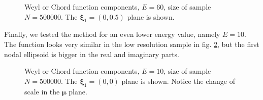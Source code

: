 \documentclass[a4paper,12pt]{article}
\newcommand{\xifase}{ {\boldsymbol{\xi}} }
\newcommand{\mufase}{ {\boldsymbol{\mu}} }
\begin{document}
\begin{figure}
\begin{center}
\caption{Weyl or Chord function components, $E=60$, size of
sample $N=500000$. The $\xifase_1=(0,0.5)$ plane is shown.}
\label{HD05}
\end{center}
\end{figure}


Finally, we tested the method for an even lower energy value, namely
$E=10$. The function looks very similar in the low resolution sample
in fig. \ref{lower}, but the first nodal ellipsoid is bigger in the
real and imaginary parts. 


\begin{figure}
\begin{center}
\caption{Weyl or Chord function components, $E=10$, size of
sample $N=500000$. The $\xifase_1=(0,0)$ plane is shown.
Notice the change of scale in the $\mufase$ plane.}
\label{lower}
\end{center}
\end{figure}
\end{document}

